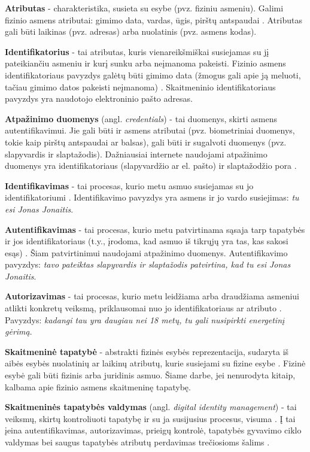 \textbf{Atributas} - charakteristika, susieta su esybe (pvz. fiziniu asmeniu). Galimi fizinio asmens atributai: gimimo data,
vardas, ūgis, pirštų antspaudai \cite{Camp2004}. Atributas gali būti laikinas (pvz. adresas) arba nuolatinis (pvz. asmens kodas).

\textbf{Identifikatorius} - tai atributas, kuris vienareikšmiškai susiejamas su jį pateikiančiu asmeniu ir kurį
sunku arba neįmanoma pakeisti. Fizinio asmens identifikatoriaus pavyzdys galėtų būti gimimo data
(žmogus gali apie ją meluoti, tačiau gimimo datos pakeisti neįmanoma) \cite{Camp2004}. Skaitmeninio identifikatoriaus
pavyzdys yra naudotojo elektroninio pašto adresas.

\textbf{Atpažinimo duomenys} (angl. \textit{credentials}) - tai duomenys, skirti asmens autentifikavimui. Jie gali būti ir asmens atributai
(pvz. biometriniai duomenys, tokie kaip pirštų antspaudai ar balsas), gali būti ir sugalvoti duomenys (pvz. slapyvardis ir slaptažodis). Dažniausiai internete naudojami
atpažinimo duomenys yra identifikatoriaus (slapyvardžio ar el. pašto) ir slaptažodžio pora \cite{Maler2008}.

\textbf{Identifikavimas} - tai procesas, kurio metu asmuo susiejamas su jo identifikatoriumi \cite{Camp2004}. Identifikavimo
pavyzdys yra asmens ir jo vardo susiejimas: \textit{tu esi Jonas Jonaitis}.

\textbf{Autentifikavimas} - tai procesas, kurio metu patvirtinama sąsaja tarp tapatybės ir jos identifikatoriaus (t.y., įrodoma,
kad asmuo iš tikrųjų yra tas, kas sakosi esąs) \cite{Camp2004, Strictest2011}. Šiam patvirtinimui naudojami atpažinimo duomenys. Autentifikavimo pavyzdys:
\textit{tavo pateiktas slapyvardis ir slaptažodis patvirtina, kad tu esi Jonas Jonaitis}.

\textbf{Autorizavimas} - tai procesas, kurio metu leidžiama arba draudžiama asmeniui atlikti konkretų veiksmą, priklausomai
nuo jo identifikatoriaus ar atributo \cite{Camp2004}. Pavyzdys: \textit{kadangi tau yra daugiau nei 18 metų, tu gali nusipirkti
energetinį gėrimą}. 

\textbf{Skaitmeninė tapatybė} - abstrakti fizinės esybės reprezentacija, sudaryta iš aibės esybės nuolatinių ar laikinų atributų,
kurie susiejami su fizine esybe \cite{Glasser2009, Camp2004}. Fizinė esybė gali būti fizinis arba juridinis asmuo.
Šiame darbe, jei nenurodyta kitaip, kalbama apie fizinio asmens skaitmeninę tapatybę.

\textbf{Skaitmeninės tapatybės valdymas} (angl. \textit{digital identity management}) - tai veiksmų, skirtų kontroliuoti
tapatybę ir su ja susijusius procesus, visuma \cite{Dabrowski2008}. Į tai įeina autentifikavimas, autorizavimas,
prieigų kontrolė, tapatybės gyvavimo ciklo
valdymas bei saugus tapatybės atributų perdavimas trečiosioms šalims \cite{Cao2010}.

